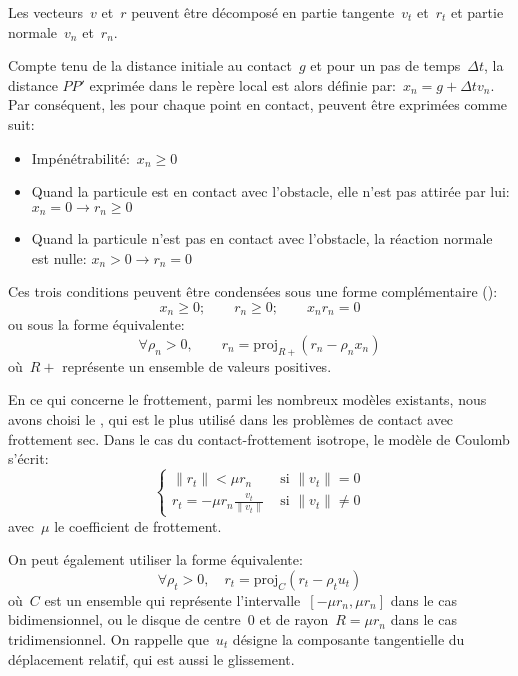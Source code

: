 Les vecteurs~$v$ et~$r$ peuvent être décomposé en partie tangente~$v_t$ et~$r_t$ et partie
normale~$v_n$ et~$r_n$.

Compte tenu de la distance initiale au contact~$g$ et pour un pas de temps~$\Delta t$, la distance
$PP'$ exprimée dans le repère local est alors définie par:~$x_n = g + \Delta t v_n$.
Par conséquent, les  pour chaque point en contact,
peuvent être exprimées comme suit:
\begin{itemize}
  \item Impénétrabilité:~$x_n \ge 0$
  \item Quand la particule est en contact avec l'obstacle, elle n'est pas attirée par lui:
	$x_n = 0 \rightarrow r_n \ge 0$
  \item Quand la particule n'est pas en contact avec l'obstacle, la réaction normale est nulle:
	$x_n > 0 \rightarrow r_n = 0$
\end{itemize}
Ces trois conditions peuvent être condensées sous une forme complémentaire ():
\begin{equation} x_n \ge 0; \qquad r_n \ge 0; \qquad x_n r_n = 0 \end{equation}
ou sous la forme équivalente:
\begin{equation} \forall \rho_n > 0, \qquad r_n = \mathrm{proj}_{R+} (r_n - \rho_n x_n) \end{equation}
où~$R+$ représente un ensemble de valeurs positives.

\medskip
En ce qui concerne le frottement, parmi les nombreux modèles existants, nous avons choisi le
,
qui est le plus utilisé dans les problèmes de contact avec frottement sec.
Dans le cas du contact-frottement isotrope, le modèle de Coulomb s'écrit:
\begin{equation} \left\{\begin{array}{ll}
\|r_t\| < \mu r_n & \text{ si } \|v_t\|=0\\
r_t=-\mu r_n \frac{v_t}{\|v_t\|} & \text{ si } \|v_t\|\ne0
\end{array}\right. \end{equation}
avec~$\mu$ le coefficient de frottement.

On peut également utiliser la forme équivalente:
\begin{equation} \forall \rho_t>0, \quad r_t= \mathrm{proj}_C (r_t-\rho_t u_t) \end{equation}
où~$C$ est un ensemble qui représente l'intervalle~$[-\mu r_n, \mu r_n]$ dans le cas bidimensionnel,
ou le disque de centre~$0$ et de rayon~$R= \mu r_n$ dans le cas tridimensionnel.
On rappelle que~$u_t$ désigne la composante tangentielle du déplacement relatif, qui est
aussi le glissement.

